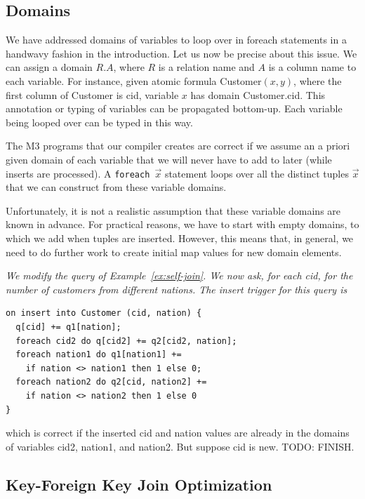 \subsection{Domains}


We have addressed domains of variables to loop over in foreach statements
in a handwavy fashion in the introduction. Let us now be precise about this
issue.
We can assign a domain $R.A$, where $R$ is a relation name and $A$ is
a column name to each variable.
For instance, given atomic formula Customer$(x,y)$, where
the first column of Customer is cid, variable $x$ has domain Customer.cid.
This annotation or typing of variables can be propagated bottom-up.
Each variable being looped over can be typed in this way.

The M3 programs that our compiler creates are correct if we assume
an a priori given domain of each variable
that we will never have to add to later (while inserts are processed).
A {\tt foreach $\vec{x}$} statement loops over all the distinct tuples
$\vec{x}$ that we can construct from these variable domains.

Unfortunately, it is not a realistic assumption that these variable domains
are known in advance. For practical reasons, we have to start with empty
domains, to which we add when tuples are inserted. However, this means that,
in general, we need to do further work to create initial map values for new
domain elements.


\begin{example}\em
We modify the query of Example~\ref{ex:self-join}. We now ask, for each cid,
for the number of customers from {\em different}\/ nations.
The insert trigger for this query is
\begin{verbatim}
on insert into Customer (cid, nation) {
  q[cid] += q1[nation];
  foreach cid2 do q[cid2] += q2[cid2, nation];
  foreach nation1 do q1[nation1] +=
    if nation <> nation1 then 1 else 0;
  foreach nation2 do q2[cid, nation2] +=
    if nation <> nation2 then 1 else 0
}
\end{verbatim}
which is correct if the inserted cid and nation values are
already in the domains of variables cid2, nation1, and nation2.
But suppose cid is new. 
TODO: FINISH.
\end{example}


\subsection{Key-Foreign Key Join Optimization}


